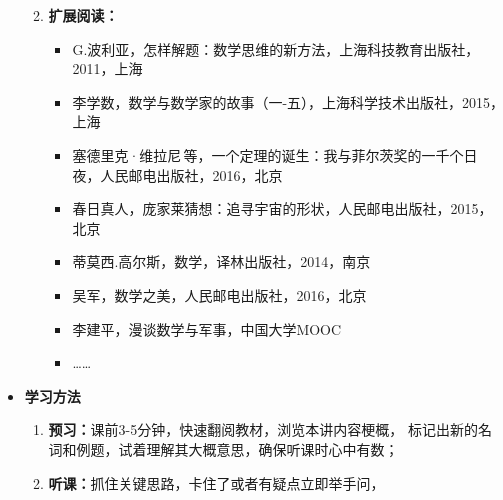\begin{itemize}
\begin{enumerate}
\begin{itemize}
		\end{itemize} 
		\item {\bf 扩展阅读：}
		\begin{itemize}
		  \item G.波利亚，怎样解题：数学思维的新方法，上海科技教育出版社，2011，上海
		  \item 李学数，数学与数学家的故事（一-五），上海科学技术出版社，2015，上海
		  \item 塞德里克·维拉尼\,等，一个定理的诞生：我与菲尔茨奖的一千个日夜，人民邮电出版社，2016，北京
		  \item 春日真人，庞家莱猜想：追寻宇宙的形状，人民邮电出版社，2015，北京
		  \item 蒂莫西.高尔斯，数学，译林出版社，2014，南京
		  \item 吴军，数学之美，人民邮电出版社，2016，北京
		  \item 李建平，漫谈数学与军事，中国大学MOOC
		  \item \ldots\ldots
		\end{itemize}
	\end{enumerate}
	\item {\bf 学习方法}
	\begin{enumerate}
	  \item {\bf 预习：}课前3-5分钟，快速翻阅教材，浏览本讲内容梗概，
	  标记出新的名词和例题，试着理解其大概意思，确保听课时心中有数；
	  \item {\bf 听课：}抓住关键思路，卡住了或者有疑点立即举手问，

\end{enumerate}
\end{itemize}
